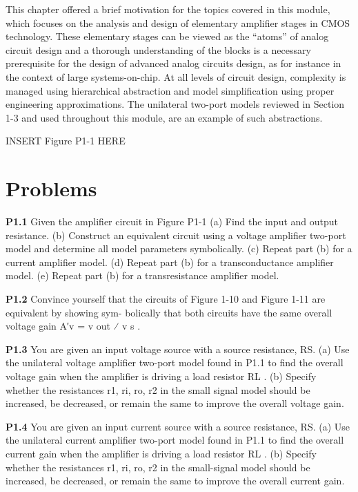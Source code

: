 \documentclass[
  11pt,
  letterpaper,
  abstract]{scrbook}
\begin{document}
This chapter offered a brief motivation for the topics covered in this
module, which focuses on the analysis and design of elementary amplifier
stages in CMOS technology. These elementary stages can be viewed as the
``atoms'' of analog circuit design and a thorough understanding of the
blocks is a necessary prerequisite for the design of advanced analog
circuits design, as for instance in the context of large
systems-on-chip. At all levels of circuit design, complexity is managed
using hierarchical abstraction and model simplification using proper
engineering approximations. The unilateral two-port models reviewed in
Section 1-3 and used throughout this module, are an example of such
abstractions.

INSERT Figure P1-1 HERE

\chapter{Problems}\label{problems}

\textbf{P1.1} Given the amplifier circuit in Figure P1-1 (a) Find the
input and output resistance. (b) Construct an equivalent circuit using a
voltage amplifier two-port model and determine all model parameters
symbolically. (c) Repeat part (b) for a current amplifier model. (d)
Repeat part (b) for a transconductance amplifier model. (e) Repeat part
(b) for a transresistance amplifier model.

\textbf{P1.2} Convince yourself that the circuits of Figure 1-10 and
Figure 1-11 are equivalent by showing sym- bolically that both circuits
have the same overall voltage gain A′v = v out ⁄ v s .

\textbf{P1.3} You are given an input voltage source with a source
resistance, RS. (a) Use the unilateral voltage amplifier two-port model
found in P1.1 to find the overall voltage gain when the amplifier is
driving a load resistor RL . (b) Specify whether the resistances r1, ri,
ro, r2 in the small signal model should be increased, be decreased, or
remain the same to improve the overall voltage gain.

\textbf{P1.4} You are given an input current source with a source
resistance, RS. (a) Use the unilateral current amplifier two-port model
found in P1.1 to find the overall current gain when the amplifier is
driving a load resistor RL . (b) Specify whether the resistances r1, ri,
ro, r2 in the small-signal model should be increased, be decreased, or
remain the same to improve the overall current gain.
\end{document}
